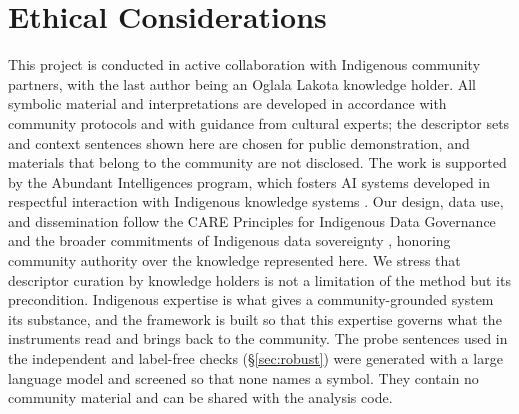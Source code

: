 \documentclass[final,creativeai]{article}
\begin{document}
\section{Ethical Considerations}
This project is conducted in active collaboration with Indigenous community partners, with the last author being an Oglala Lakota knowledge holder. All symbolic material and interpretations are developed in accordance with community protocols and with guidance from cultural experts; the descriptor sets and context sentences shown here are chosen for public demonstration, and materials that belong to the community are not disclosed. The work is supported by the Abundant Intelligences program, which fosters AI systems developed in respectful interaction with Indigenous knowledge systems \citep{lewis_indigenous_2020}. Our design, data use, and dissemination follow the CARE Principles for Indigenous Data Governance \citep{carroll_care_2020} and the broader commitments of Indigenous data sovereignty \citep{kukutai_indigenous_2016}, honoring community authority over the knowledge represented here. We stress that descriptor curation by knowledge holders is not a limitation of the method but its precondition. Indigenous expertise is what gives a community-grounded system its substance, and the framework is built so that this expertise governs what the instruments read and brings back to the community. The probe sentences used in the independent and label-free checks (\S\ref{sec:robust}) were generated with a large language model and screened so that none names a symbol. They contain no community material and can be shared with the analysis code.



\end{document}
